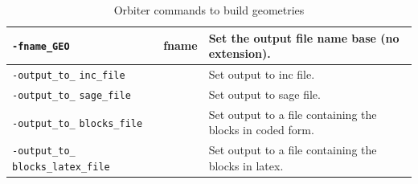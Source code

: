 \begin{table}
\begin{center}
\begin{tabular}{|p{4cm}|p{3cm}|p{7cm}|}
		\hline
		\verb'-fname_GEO' & fname & Set the output file name base (no extension). \\
		\hline
		\verb'-output_to_' \verb'inc_file' &  & Set output to inc file.  \\
		\hline
		\verb'-output_to_' \verb'sage_file' &  & Set output to sage file. \\
		\hline
		\verb'-output_to_' \verb'blocks_file' &  & Set output to a file containing the blocks in coded form. \\
		\hline
		\verb'-output_to_' \verb'blocks_latex_file' &  & Set output to a file containing the blocks in latex. \\
		\hline
		\end{tabular}
	\end{center}
	\caption{\label{tab:geometry:builder}Orbiter commands to build geometries}
	\end{table}


\bigskip

